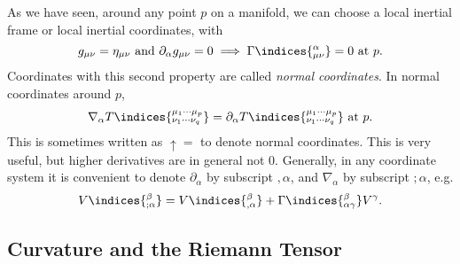 \documentclass[12pt]{article}
\begin{document}
As we have seen, around any point $p$ on a manifold, we can choose a local inertial frame or local inertial coordinates, with
\[
	g_{\mu\nu} = \eta_{\mu\nu} \text{ and } \partial_\alpha g_{\mu\nu} = 0 \implies \Gamma\indices{^\alpha_{\mu\nu}} = 0 \text{ at } p.
\]
Coordinates with this second property are called \emph{normal coordinates}. In normal coordinates around $p$,
\[
	\nabla_\alpha T\indices{^{\mu_1\cdots \mu_p}_{\nu_1\cdots \nu_q}} = \partial_\alpha T \indices{^{\mu_1 \cdots \mu_p}_{\nu_1 \cdots \nu_q}} \text{ at } p.
\]
This is sometimes written as $\uparrow =$ to denote normal coordinates. This is very useful, but higher derivatives are in general not $0$. Generally, in any coordinate system it is convenient to denote $\partial_\alpha$ by subscript $,\alpha$, and $\nabla_\alpha$ by subscript $; \alpha$, e.g.
\[
	V\indices{^\beta_{;\alpha}} = V\indices{^\beta_{,\alpha}} + \Gamma\indices{^\beta_{\alpha\gamma}} V^\gamma.
\]

\subsection{Curvature and the Riemann Tensor}
\label{sub:cur_rt}
\end{document}
